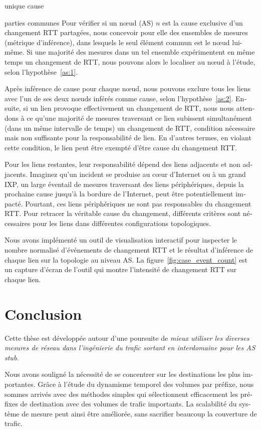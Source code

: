 \begin{otherlanguage}{french}
\begin{supposition}{1}{unique cause}
\begin{supposition}{2}{parties communes}
Pour vérifier si un nœud (AS) $n$ est la cause exclusive d'un changement RTT partagées, nous
concevoir pour elle des ensembles de mesures (métrique d'inférence), dans lesquels le seul élément commun est le nœud lui-même. 
Si une majorité des mesures dans un tel ensemble expérimentent en même temps un changement de RTT, nous pouvons alors le localiser au nœud à l'étude, selon l'hypothèse~\ref{as:1}.

Après inférence de cause pour chaque nœud, nous pouvons exclure tous les liens avec l'un de ses deux nœuds inférés comme cause, selon l'hypothèse~\ref{as:2}.
Ensuite, si un lien provoque effectivement un changement de RTT, nous nous attendons à ce qu'une majorité de mesures traversant ce lien subissent simultanément (dans un même intervalle de temps) un changement de RTT, 
condition nécessaire mais non suffisante pour la responsabilité de lien. 
En d'autres termes, en violant cette condition, le lien peut être exempté d'être cause du changement RTT.

Pour les liens restantes, leur responsabilité dépend des liens adjacents et non adjacents. 
Imaginez qu'un incident se produise au cœur d'Internet ou à un grand IXP, un large éventail de mesures traversant des liens périphériques, depuis la prochaine cause jusqu'à la bordure de l'Internet, peut être potentiellement impacté. 
Pourtant, ces liens périphériques ne sont pas responsables du changement RTT.
Pour retracer la véritable cause du changement, différents critères sont nécessaires pour les liens dans différentes configurations topologiques.

Nous avons implémenté un outil de visualisation interactif pour inspecter le nombre normalisé d'événements de changement RTT 
et le résultat d'inférence de chaque lien sur la topologie au niveau AS.
La figure~\ref{fig:case_event_count} est un capture d'écran de l'outil qui montre l'intensité de changement RTT sur chaque lien.

\section{Conclusion}

Cette thèse est développée autour d'une poursuite de 
\textit{mieux utiliser les diverses mesures de réseau dans l'ingénierie du trafic sortant en interdomaine pour les AS stub}.

Nous avons souligné la nécessité de se concentrer sur les destinations les plus importantes.
Grâce à l'étude du dynamisme temporel des volumes par préfixe,
nous sommes arrivés avec des méthodes simples qui sélectionnent efficacement les préfixes de destination avec des volumes de trafic importants.
La scalabilité du système de mesure peut ainsi être améliorée, sans sacrifier beaucoup la couverture de trafic.


\end{supposition}
\end{supposition}
\end{otherlanguage}
